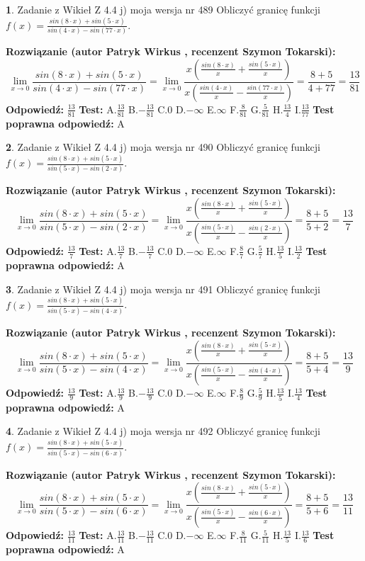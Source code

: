 \documentclass[12pt, a4paper]{article}
\theoremstyle{definition} %
\newtheorem{zad}{}
\newcommand{\zadStart}[1]{\begin{zad}#1\newline}
\newcommand{\zadStop}{\end{zad}}
\newcommand{\rozwStart}[2]{\noindent \textbf{Rozwiązanie (autor #1 , recenzent #2): }\newline}
\newcommand{\rozwStop}{\newline}
\newcommand{\odpStart}{\noindent \textbf{Odpowiedź:}\newline}
\newcommand{\odpStop}{\newline}
\newcommand{\testStart}{\noindent \textbf{Test:}\newline}
\newcommand{\testStop}{\newline}
\newcommand{\kluczStart}{\noindent \textbf{Test poprawna odpowiedź:}\newline}
\newcommand{\kluczStop}{\newline}
\begin{document}
\zadStart{Zadanie z Wikieł Z 4.4 j) moja wersja nr 489}
Obliczyć granicę funkcji $f(x)=\frac{sin(8\cdot x) +sin(5\cdot x)}{sin(4\cdot x) -sin(77\cdot x)}$.
\zadStop
\rozwStart{Patryk Wirkus}{Szymon Tokarski}
$$\lim\limits_{x\to 0}\frac{sin(8\cdot x) +sin(5\cdot x)}{sin(4\cdot x) -sin(77\cdot x)}=\lim\limits_{x\to 0}\frac{x(\frac{sin(8\cdot x)}{x}+\frac{sin(5\cdot x)}{x})}{x(\frac{sin(4\cdot x)}{x}-\frac{sin(77\cdot x)}{x})}=\frac{8+5}{4+77} = \frac{13}{81}$$
\rozwStop
\odpStart
$\frac{13}{81}$
\odpStop
\testStart
A.$\frac{13}{81}$
B.$-\frac{13}{81}$
C.$0$
D.$-\infty$
E.$\infty$
F.$\frac{8}{81}$
G.$\frac{5}{81}$
H.$\frac{13}{4}$
I.$\frac{13}{77}$
\testStop
\kluczStart
A
\kluczStop



\zadStart{Zadanie z Wikieł Z 4.4 j) moja wersja nr 490}
Obliczyć granicę funkcji $f(x)=\frac{sin(8\cdot x) +sin(5\cdot x)}{sin(5\cdot x) -sin(2\cdot x)}$.
\zadStop
\rozwStart{Patryk Wirkus}{Szymon Tokarski}
$$\lim\limits_{x\to 0}\frac{sin(8\cdot x) +sin(5\cdot x)}{sin(5\cdot x) -sin(2\cdot x)}=\lim\limits_{x\to 0}\frac{x(\frac{sin(8\cdot x)}{x}+\frac{sin(5\cdot x)}{x})}{x(\frac{sin(5\cdot x)}{x}-\frac{sin(2\cdot x)}{x})}=\frac{8+5}{5+2} = \frac{13}{7}$$
\rozwStop
\odpStart
$\frac{13}{7}$
\odpStop
\testStart
A.$\frac{13}{7}$
B.$-\frac{13}{7}$
C.$0$
D.$-\infty$
E.$\infty$
F.$\frac{8}{7}$
G.$\frac{5}{7}$
H.$\frac{13}{5}$
I.$\frac{13}{2}$
\testStop
\kluczStart
A
\kluczStop



\zadStart{Zadanie z Wikieł Z 4.4 j) moja wersja nr 491}
Obliczyć granicę funkcji $f(x)=\frac{sin(8\cdot x) +sin(5\cdot x)}{sin(5\cdot x) -sin(4\cdot x)}$.
\zadStop
\rozwStart{Patryk Wirkus}{Szymon Tokarski}
$$\lim\limits_{x\to 0}\frac{sin(8\cdot x) +sin(5\cdot x)}{sin(5\cdot x) -sin(4\cdot x)}=\lim\limits_{x\to 0}\frac{x(\frac{sin(8\cdot x)}{x}+\frac{sin(5\cdot x)}{x})}{x(\frac{sin(5\cdot x)}{x}-\frac{sin(4\cdot x)}{x})}=\frac{8+5}{5+4} = \frac{13}{9}$$
\rozwStop
\odpStart
$\frac{13}{9}$
\odpStop
\testStart
A.$\frac{13}{9}$
B.$-\frac{13}{9}$
C.$0$
D.$-\infty$
E.$\infty$
F.$\frac{8}{9}$
G.$\frac{5}{9}$
H.$\frac{13}{5}$
I.$\frac{13}{4}$
\testStop
\kluczStart
A
\kluczStop



\zadStart{Zadanie z Wikieł Z 4.4 j) moja wersja nr 492}
Obliczyć granicę funkcji $f(x)=\frac{sin(8\cdot x) +sin(5\cdot x)}{sin(5\cdot x) -sin(6\cdot x)}$.
\zadStop
\rozwStart{Patryk Wirkus}{Szymon Tokarski}
$$\lim\limits_{x\to 0}\frac{sin(8\cdot x) +sin(5\cdot x)}{sin(5\cdot x) -sin(6\cdot x)}=\lim\limits_{x\to 0}\frac{x(\frac{sin(8\cdot x)}{x}+\frac{sin(5\cdot x)}{x})}{x(\frac{sin(5\cdot x)}{x}-\frac{sin(6\cdot x)}{x})}=\frac{8+5}{5+6} = \frac{13}{11}$$
\rozwStop
\odpStart
$\frac{13}{11}$
\odpStop
\testStart
A.$\frac{13}{11}$
B.$-\frac{13}{11}$
C.$0$
D.$-\infty$
E.$\infty$
F.$\frac{8}{11}$
G.$\frac{5}{11}$
H.$\frac{13}{5}$
I.$\frac{13}{6}$
\testStop
\kluczStart
A
\kluczStop
\end{document}
